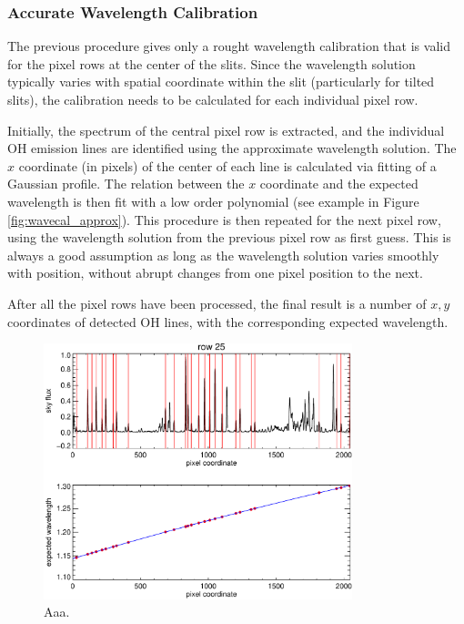 \documentclass[a4paper, notitlepage]{article}
\begin{document}
\subsubsection{Accurate Wavelength Calibration}

The previous procedure gives only a rought wavelength calibration that is valid for the pixel rows at the center of the slits. Since the wavelength solution typically varies with spatial coordinate within the slit (particularly for tilted slits), the calibration needs to be calculated for each individual pixel row.

Initially, the spectrum of the central pixel row is extracted, and the individual OH emission lines are identified using the approximate wavelength solution. The $x$ coordinate (in pixels) of the center of each line is calculated via fitting of a Gaussian profile. The relation between the $x$ coordinate and the expected wavelength is then fit with a low order polynomial (see example in Figure \ref{fig:wavecal_approx}). This procedure is then repeated for the next pixel row, using the wavelength solution from the previous pixel row as first guess. This is always a good assumption as long as the wavelength solution varies smoothly with position, without abrupt changes from one pixel position to the next.

After all the pixel rows have been processed, the final result is a number of $x,y$ coordinates of detected OH lines, with the corresponding expected wavelength.


\begin{figure}[htbp]
\centering
\includegraphics[width=0.8\textwidth]{wavecal_accurate}
\caption{Aaa.}
\label{fig:wavecal_accurate}
\end{figure}
\end{document}
